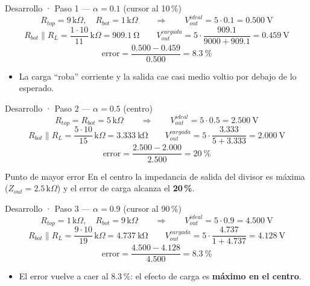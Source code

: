 \documentclass[aspectratio=169]{beamer}
\begin{document}
\begin{frame}{Desarrollo · Paso 1 — $\alpha = 0.1$ (cursor al 10\,\%)}
  \[
    R_{top} = 9\,\text{k}\Omega,\quad R_{bot} = 1\,\text{k}\Omega
    \qquad\Rightarrow\qquad
    V_{out}^{ideal} = 5\cdot 0.1 = \SI{0.500}{\volt}
  \]
  \[
    R_{bot}\parallel R_L = \frac{1\cdot 10}{11}\,\text{k}\Omega = \SI{909.1}{\ohm}
    \qquad
    V_{out}^{cargada} = 5\cdot\frac{909.1}{9000+909.1} = \SI{0.459}{\volt}
  \]
  \[
    \text{error} = \frac{0.500-0.459}{0.500} = \SI{8.3}{\percent}
  \]
  \pause
  \begin{itemize}
    \item La carga ``roba'' corriente y la salida cae casi medio voltio por debajo de lo esperado.
  \end{itemize}
\end{frame}

\begin{frame}{Desarrollo · Paso 2 — $\alpha = 0.5$ (centro)}
  \[
    R_{top} = R_{bot} = 5\,\text{k}\Omega
    \qquad\Rightarrow\qquad
    V_{out}^{ideal} = 5\cdot 0.5 = \SI{2.500}{\volt}
  \]
  \[
    R_{bot}\parallel R_L = \frac{5\cdot 10}{15}\,\text{k}\Omega = \SI{3.333}{\kilo\ohm}
    \qquad
    V_{out}^{cargada} = 5\cdot\frac{3.333}{5+3.333} = \SI{2.000}{\volt}
  \]
  \[
    \text{error} = \frac{2.500-2.000}{2.500} = \SI{20}{\percent}
  \]
  \pause
  \begin{alertblock}{Punto de mayor error}
    En el centro la impedancia de salida del divisor es máxima
    ($Z_{out} = 2.5\,\text{k}\Omega$) y el error de carga alcanza el \textbf{20\,\%}.
  \end{alertblock}
\end{frame}

\begin{frame}{Desarrollo · Paso 3 — $\alpha = 0.9$ (cursor al 90\,\%)}
  \[
    R_{top} = 1\,\text{k}\Omega,\quad R_{bot} = 9\,\text{k}\Omega
    \qquad\Rightarrow\qquad
    V_{out}^{ideal} = 5\cdot 0.9 = \SI{4.500}{\volt}
  \]
  \[
    R_{bot}\parallel R_L = \frac{9\cdot 10}{19}\,\text{k}\Omega = \SI{4.737}{\kilo\ohm}
    \qquad
    V_{out}^{cargada} = 5\cdot\frac{4.737}{1+4.737} = \SI{4.128}{\volt}
  \]
  \[
    \text{error} = \frac{4.500-4.128}{4.500} = \SI{8.3}{\percent}
  \]
  \pause
  \begin{itemize}
    \item El error vuelve a caer al 8.3\,\%: el efecto de carga es \textbf{máximo en el centro}.
  \end{itemize}
\end{frame}
\end{document}
